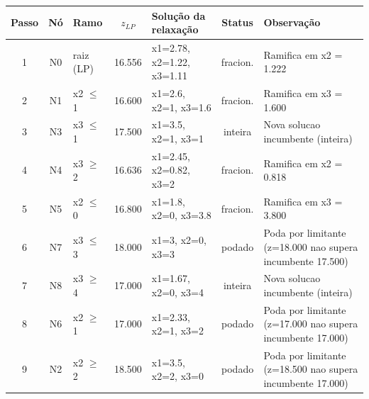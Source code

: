 \begin{footnotesize}
\begin{longtable}{c c l c l c p{4.2cm}}
\toprule
Passo & N\'o & Ramo & $z_{LP}$ & Solu\c{c}\~ao da relaxa\c{c}\~ao & Status & Observa\c{c}\~ao \\
\midrule
\endhead
1 & N0 & raiz (LP) & 16.556 & x1=2.78, x2=1.22, x3=1.11 & fracion. & Ramifica em x2 = 1.222 \\
2 & N1 & x2 $\leq$ 1 & 16.600 & x1=2.6, x2=1, x3=1.6 & fracion. & Ramifica em x3 = 1.600 \\
3 & N3 & x3 $\leq$ 1 & 17.500 & x1=3.5, x2=1, x3=1 & inteira & Nova solucao incumbente (inteira) \\
4 & N4 & x3 $\geq$ 2 & 16.636 & x1=2.45, x2=0.82, x3=2 & fracion. & Ramifica em x2 = 0.818 \\
5 & N5 & x2 $\leq$ 0 & 16.800 & x1=1.8, x2=0, x3=3.8 & fracion. & Ramifica em x3 = 3.800 \\
6 & N7 & x3 $\leq$ 3 & 18.000 & x1=3, x2=0, x3=3 & podado & Poda por limitante (z=18.000 nao supera incumbente 17.500) \\
7 & N8 & x3 $\geq$ 4 & 17.000 & x1=1.67, x2=0, x3=4 & inteira & Nova solucao incumbente (inteira) \\
8 & N6 & x2 $\geq$ 1 & 17.000 & x1=2.33, x2=1, x3=2 & podado & Poda por limitante (z=17.000 nao supera incumbente 17.000) \\
9 & N2 & x2 $\geq$ 2 & 18.500 & x1=3.5, x2=2, x3=0 & podado & Poda por limitante (z=18.500 nao supera incumbente 17.000) \\
\bottomrule
\end{longtable}
\end{footnotesize}
